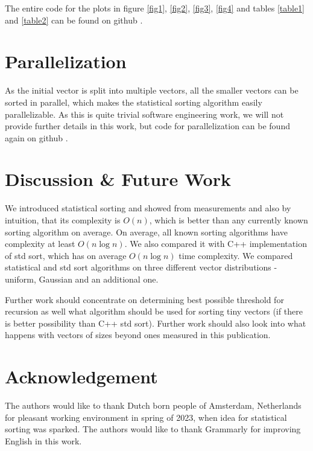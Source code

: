 \documentclass[12pt]{article}
\begin{document}
		
		The entire code for the plots in figure \ref{fig1}, \ref{fig2}, \ref{fig3}, \ref{fig4} and tables \ref{table1} and \ref{table2} can be found on github \cite{peta78}.
		
	\section{Parallelization}
	
	As the initial vector is split into multiple vectors, all the smaller vectors can be sorted in parallel, which makes the statistical sorting algorithm easily parallelizable. As this is quite trivial software engineering work, we will not provide further details in this work, but code for parallelization can be found again on github \cite{peta78b}.

	\section{Discussion \& Future Work}
	
	We introduced statistical sorting and showed from measurements and also by intuition, that its complexity is $O(n)$, which is better than any currently known sorting algorithm on average. On average, all known sorting algorithms have complexity at least $O( n \log n)$. We also compared it with C++ implementation of std sort, which has on average $O(n \log n)$ time complexity. We compared statistical and std sort algorithms on three different vector distributions - uniform, Gaussian and an additional one.
	
	Further work should concentrate on determining best possible threshold for recursion as well what algorithm should be used for sorting tiny vectors (if there is better possibility than C++ std sort). Further work should also look into what happens with vectors of sizes beyond ones measured in this publication.
	
	\section*{Acknowledgement}
	
	The authors would like to thank Dutch born people of Amsterdam, Netherlands for pleasant working environment in spring of 2023, when idea for statistical sorting was sparked. The authors would like to thank Grammarly for improving English in this work.
	
\end{document}
